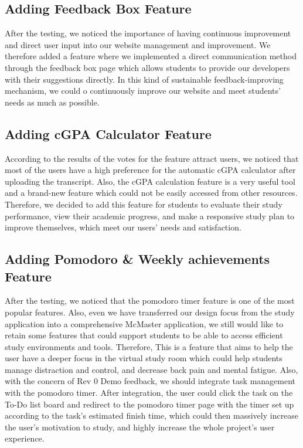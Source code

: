\documentclass[12pt, titlepage]{article}
\begin{document}
\subsection{Adding Feedback Box Feature}\label{FEEP}

After the testing, we noticed the importance of having continuous improvement and direct user input into our website management and improvement.
We therefore added a feature where we implemented a direct communication method through the feedback box page which allows students to provide our developers with their suggestions directly.  In this kind of sustainable feedback-improving mechanism, we could o continuously improve our website and meet students’ needs as much as possible.

\subsection{Adding cGPA Calculator Feature}\label{PEDC}

According to the results of the votes for the feature attract users, we noticed that most of the users have a high preference for the automatic cGPA calculator after uploading the transcript. Also, the cGPA calculation feature is a very useful tool and a brand-new feature which could not be easily accessed from other resources. Therefore, we decided to add this feature for students to evaluate their study performance, view their academic progress, and make a responsive study plan to improve themselves, which meet our users' needs and satisfaction.

\subsection{Adding Pomodoro \& Weekly achievements Feature}\label{PWAC}

After the testing, we noticed that the pomodoro timer feature is one of the most popular features. Also, even we have transferred our design focus from the study application into a comprehensive McMaster application, we still would like to retain some features that could support students to be able to access efficient study environments and tools. Therefore, This is a feature that aims to help the user have a deeper focus in the virtual study room which could help students manage distraction and control, and decrease back pain and mental fatigue. Also, with the concern of Rev 0 Demo feedback, we should integrate task management with the pomodoro timer. After integration, the user could click the task on the To-Do list board and redirect to the pomodoro timer page with the timer set up according to the task's estimated finish time, which could then massively increase the user’s motivation to study, and highly increase the whole project's user experience.
\end{document}
